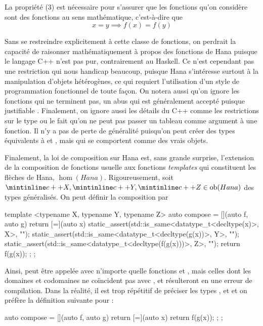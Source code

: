 La propriété (3) est nécessaire pour s'assurer que les fonctions qu'on
considère sont des fonctions au sens mathématique, c'est-à-dire que
\[
    x = y \implies f(x) = f(y)
\]

Sans se restreindre explicitement à cette classe de fonctions, on perdrait la
capacité de raisonner mathématiquement à propos des fonctions de Hana puisque
le langage C++ n'est pas pur, contrairement au Haskell. Ce n'est cependant pas
une restriction qui nous handicap beaucoup, puisque Hana s'intéresse surtout à
la manipulation d'objets hétérogènes, ce qui requiert l'utilisation d'un style
de programmation fonctionnel de toute façon. On notera aussi qu'on ignore les
fonctions qui ne terminent pas, un abus qui est généralement accepté puisque
justifiable \cite{danielsson06}. Finalement, on ignore aussi les détails du
C++ comme les restrictions sur le type  ou le fait qu'on ne peut pas
passer un tableau comme argument à une fonction. Il n'y a pas de perte de
généralité puisqu'on peut créer des types équivalents à  et ,
mais qui se comportent comme des vrais objets.

Finalement, la loi de composition sur Hana est, sans grande surprise,
l'extension de la composition de fonctions usuelle aux fonctions
\textit{templates} qui constituent les flèches de Hana, $\hom(Hana)$.
Rigoureusement, soit $\icpp{X}, \icpp{Y}, \icpp{Z} \in \ob(Hana)$ des
types généralisés. On peut définir la composition par
\begin{cpp}
    template <typename X, typename Y, typename Z>
    auto compose = [](auto f, auto g) {
        return [=](auto x) {
            static_assert(std::is_same<datatype_t<decltype(x)>, X>{}, "");
            static_assert(std::is_same<datatype_t<decltype(g(x))>, Y>{}, "");
            static_assert(std::is_same<datatype_t<decltype(f(g(x)))>, Z>{}, "");
            return f(g(x));
        };
    };
\end{cpp}

Ainsi,  peut être appelée avec n'importe quelle fonctions
 et , mais celles dont les domaines et codomaines ne coïncident
pas avec ,  et  résulteront en une erreur de compilation.
Dans la réalité, il est trop répétitif de préciser les types , 
et  et on préfère la définition suivante pour :
\begin{cpp}
    auto compose = [](auto f, auto g) {
        return [=](auto x) {
            return f(g(x));
        };
    };
\end{cpp}

